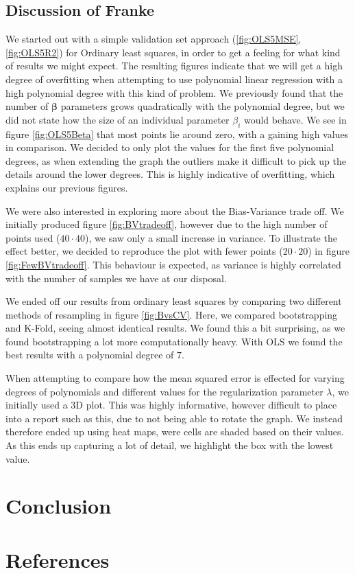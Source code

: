 \documentclass{article}
\begin{document}
\subsection{Discussion of Franke}
We started out with a simple validation set approach (\ref{fig:OLS5MSE}, \ref{fig:OLS5R2}) for Ordinary least squares, in order to get a feeling for what kind of results we might expect. The resulting figures indicate that we will get a high degree of overfitting when attempting to use polynomial linear regression with a high polynomial degree with this kind of problem. We previously found that the number of $\boldsymbol{\beta}$ parameters grows quadratically with the polynomial degree, but we did not state how the size of an individual parameter $\beta_i$ would behave. We see in figure \ref{fig:OLS5Beta} that most points lie around zero, with a gaining high values in comparison. We decided to only plot the values for the first five polynomial degrees, as when extending the graph the outliers make it difficult to pick up the details around the lower degrees. This is highly indicative of overfitting, which explains our previous figures.

We were also interested in exploring more about the Bias-Variance trade off. We initially produced figure \ref{fig:BVtradeoff}, however due to the high number of points used ($40 \cdot 40$), we saw only a small increase in variance. To illustrate the effect better, we decided to reproduce the plot with fewer points ($20 \cdot 20$) in figure \ref{fig:FewBVtradeoff}. This behaviour is expected, as variance is highly correlated with the number of samples we have at our disposal.

We ended off our results from ordinary least squares by comparing two different methods of resampling in figure \ref{fig:BvsCV}. Here, we compared bootstrapping and K-Fold, seeing almost identical results. We found this a bit surprising, as we found bootstrapping a lot more computationally heavy. With OLS we found the best results with a polynomial degree of $7$.

When attempting to compare how the mean squared error is effected for varying degrees of polynomials and different values for the regularization parameter $\lambda$, we initially used a 3D plot. This was highly informative, however difficult to place into a report such as this, due to not being able to rotate the graph. We instead therefore ended up using heat maps, were cells are shaded based on their values. As this ends up capturing a lot of detail, we highlight the box with the lowest value.





\section{Conclusion}

\section{References}

\end{document}
